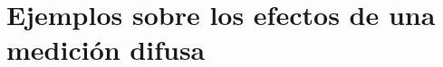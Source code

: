     

\begin{comment}
\subsection{Otra aproximación}
    Ahora, considerando una medida proyectiva, supóngase que el observable es no degenerado y la salida de la medición sobre el estado inicial $\rho $ fue el valor propio $a_j b_k$ con $j,k=0,1$ y el operador de proyección será $P_{a_j,b_k}$. Luego, el estado después de la medición será \begin{equation}
       \begin{split}
           \rho'&= p\dfrac{ P_{a_j,b_k}\rho P_{a_j,b_k}}{\tr(\rho P_{a_j,b_k})}+ (1-p)\dfrac{S P_{a_j,b_k}\rho P_{a_j,b_k}S^\dagger}{\tr(\rho P_{a_j,b_k} S^\dagger SP_{a_j,b_k})}\\
           &=\dfrac{p P_{a_j,b_k}\rho P_{a_j,b_k}+(1-p) S P_{a_j,b_k}\rho P_{a_j,b_k}S^\dagger}{\tr(\rho P_{a_j,b_k})},
       \end{split}
    \end{equation} donde $S$ es el operador SWAP\@. En consecuencia, los operadores de Kraus que describen el efecto de la medición para una medida selectiva serán $\{\sqrt{p}P_{a_j,b_k}, (\sqrt{1-p})S P_{a_j,b_k}\}$, con $j,k=0,1$. Este mapeo contempla la forma de la operaciones cuánticas normalizadas $\E(\rho)/\tr(\E(\rho))$. Para esta aproximación se realizó un  programa que mapea un operador de estado inicial a un estado final después de una medición difusa, que se describe con esta aproximación con la que se pueden obtener varios ejemplos. El programa se puede obtener en el repositorio \href{https://github.com/Mohs9/Practicas_Tesis/blob/d751cf4a3b187f124057c927433b29aa6d918ef1/InformeFinal/Code/FuzzyMeasure.nb}{\textit{al presionar este texto.}}
\end{comment}
    



\section{Ejemplos sobre los efectos de una medición difusa}

